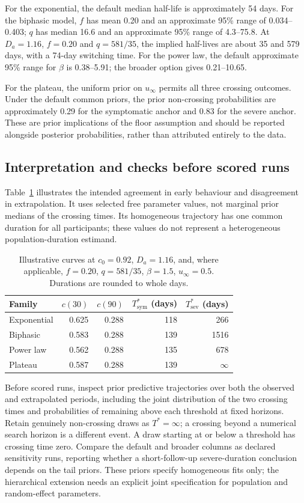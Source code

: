 \documentclass[11pt,a4paper]{article}
\begin{document}
For the exponential, the default median half-life is approximately 54
days. For the biphasic model, $f$ has mean 0.20 and an approximate 95\%
range of 0.034--0.403; $q$ has median 16.6 and an approximate 95\% range
of 4.3--75.8. At $D_a=1.16$, $f=0.20$ and $q=581/35$, the implied
half-lives are about 35 and 579 days, with a 74-day switching time.
For the power law, the default approximate 95\% range for $\beta$ is
0.38--5.91; the broader option gives 0.21--10.65.

For the plateau, the uniform prior on $u_\infty$ permits all three
crossing outcomes. Under the default common priors, the prior non-crossing
probabilities are approximately 0.29 for the symptomatic anchor and 0.83
for the severe anchor. These are prior implications of the floor assumption
and should be reported alongside posterior probabilities, rather than
attributed entirely to the data.

\subsection*{Interpretation and checks before scored runs}

Table~\ref{tab:prior-example} illustrates the intended agreement in early
behaviour and disagreement in extrapolation. It uses selected free
parameter values, not marginal prior medians of the crossing times. Its
homogeneous trajectory has one common duration for all participants; these
values do not represent a heterogeneous population-duration estimand.

\begin{table}[H]
\centering
\small
\caption{Illustrative curves at $c_0=0.92$, $D_a=1.16$, and, where
applicable, $f=0.20$, $q=581/35$, $\beta=1.5$, $u_\infty=0.5$.
Durations are rounded to whole days.}
\label{tab:prior-example}
\begin{tabular}{@{}lrrrr@{}}
\toprule
Family & $c(30)$ & $c(90)$ & $T^*_{\mathrm{sym}}$ (days)
  & $T^*_{\mathrm{sev}}$ (days) \\
\midrule
Exponential & 0.625 & 0.288 & 118 & 266 \\
Biphasic & 0.583 & 0.288 & 139 & 1516 \\
Power law & 0.562 & 0.288 & 135 & 678 \\
Plateau & 0.587 & 0.288 & 139 & $\infty$ \\
\bottomrule
\end{tabular}
\end{table}

Before scored runs, inspect prior predictive trajectories over both the
observed and extrapolated periods, including the joint distribution of the
two crossing times and probabilities of remaining above each threshold at
fixed horizons. Retain genuinely non-crossing draws as $T^*=\infty$;
a crossing beyond a numerical search horizon is a different event. A draw
starting at or below a threshold has crossing time zero. Compare the default
and broader columns as declared sensitivity runs, reporting whether a
short-follow-up severe-duration conclusion depends on the tail priors.
These priors specify homogeneous fits only; the hierarchical extension
needs an explicit joint specification for population and random-effect
parameters.
\end{document}
